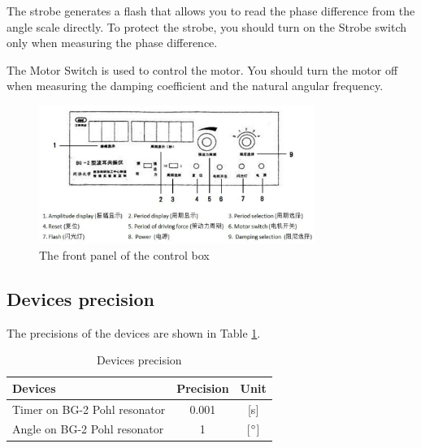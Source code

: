 The strobe generates a flash that allows you to read the phase difference from
the angle scale directly. To protect the strobe, you should turn on the Strobe
switch only when measuring the phase difference. 

The Motor Switch is used to control the motor. You should turn the motor off
when measuring the damping coefficient and the natural angular frequency. 

\begin{figure}[H]
\centering
\includegraphics[width=0.8\textwidth]{fig/es3}
\caption{The front panel of the control box}\label{panel}
\end{figure}

\subsection{Devices precision}
The precisions of the devices are shown in Table \ref{precision}.
\begin{table}[H]
\centering
\begin{tabular}{|l|c|c|}
\hline
Devices & Precision & Unit\\ \hline
Timer on BG-2 Pohl resonator & 0.001 & [s]\\ \hline
Angle on BG-2 Pohl resonator & 1 & [$^\circ$]\\ \hline
\end{tabular}
\caption{Devices precision}\label{precision}
\end{table}
